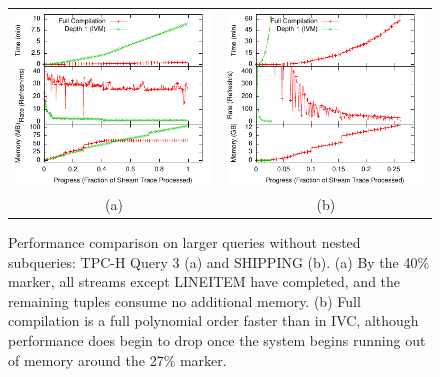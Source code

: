 \begin{figure}
\begin{center}

\begin{minipage}{\textwidth}
\begin{center}
\begin{tabular}{cc}
\includegraphics[width=\figurewidth]{../graphs/graphs/unified_tpch3.pdf} &
\includegraphics[width=\figurewidth]{../graphs/graphs/unified_ssb4.pdf} \\
(a) & (b)
\end{tabular}
\caption{Performance comparison on larger queries without nested subqueries: TPC-H Query 3 (a) and SHIPPING (b). (a) By the 40\% marker, all streams except LINEITEM have completed, and the remaining tuples consume no additional memory. (b) Full compilation is a full polynomial order faster than in IVC, although performance does begin to drop once the system begins running out of memory around the 27\% marker.}
\label{fig:experiments:tpch3}  
\label{fig:experiments:ssb4}
\end{center}
\end{minipage}


\end{center}
\end{figure}

